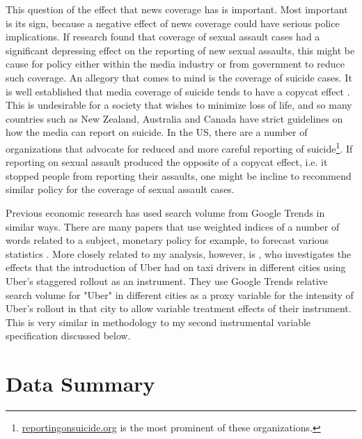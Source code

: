 \documentclass[AER,draftmode]{AEA}
\begin{document}
This question of the effect that news coverage has is important. Most important is its sign, because a negative effect of news coverage could have serious police implications. If research found that coverage of sexual assault cases had a significant depressing effect on the reporting of new sexual assaults, this might be cause for policy either within the media industry or from government to reduce such coverage. An allegory that comes to mind is the coverage of suicide cases. It is well established that media coverage of suicide tends to have a copycat effect \cite{stack_media_2003}. This is undesirable for a society that wishes to minimize loss of life, and so many countries such as New Zealand, Australia and Canada have strict guidelines on how the media can report on suicide. In the US, there are a number of organizations that advocate for reduced and more careful reporting of suicide\footnote{\url{reportingonsuicide.org} is the most prominent of these organizations.}. If reporting on sexual assault produced the opposite of a copycat effect, i.e. it stopped people from reporting their assaults, one might be incline to recommend similar policy for the coverage of sexual assault cases. 

Previous economic research has used search volume from Google Trends in similar ways. There are many papers that use weighted indices of a number of words related to a subject, monetary policy for example, to forecast various statistics \cite{wohlfarth_measuring_2018,yu_online_2019}. More closely related to my analysis, however, is , who investigates the effects that the introduction of Uber had on taxi drivers in different cities using Uber's staggered rollout as an instrument. They use Google Trends relative search volume for "Uber" in different cities as a proxy variable for the intensity of Uber's rollout in that city to allow variable treatment effects of their instrument. This is very similar in methodology to my second instrumental variable specification discussed below.

\section{Data Summary}
\end{document}
